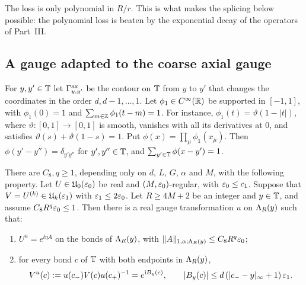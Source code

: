 The loss is only polynomial in $R/r$. This is what makes the splicing below possible: the polynomial loss is beaten by the exponential decay of the operators of Part~III.

\subsection{A gauge adapted to the coarse axial gauge}

For $y,y'\in\mathbb T$ let $\Gamma^{\rm ax}_{y,y'}$ be the contour on $\mathbb T$ from $y$ to $y'$ that changes the coordinates in the order $d,d-1,\dots,1$. Let $\phi_1\in C^\infty(\mathbb R)$ be supported in $[-1,1]$, with $\phi_1(0)=1$ and $\sum_{m\in\mathbb Z}\phi_1(t-m)=1$. For instance, $\phi_1(t)=\vartheta(1-|t|)$, where $\vartheta:[0,1]\to[0,1]$ is smooth, vanishes with all its derivatives at $0$, and satisfies $\vartheta(s)+\vartheta(1-s)=1$. Put $\phi(x)=\prod_\mu\phi_1(x_\mu)$. Then $\phi(y'-y'')=\delta_{y'y''}$ for $y',y''\in\mathbb T$, and $\sum_{y'\in\mathbb T}\phi(x-y')=1$.

\begin{lemma}\label{lem:adapted-gauge}
There are $C_8,q\ge1$, depending only on $d$, $L$, $G$, $\alpha$ and $M$, with the following property. Let $U\in\mathfrak U_0(\varepsilon_0)$ be real and $(M,\varepsilon_0)$-regular, with $\varepsilon_0\le c_1$. Suppose that $V=U^{(k)}\in\mathfrak U_k(\varepsilon_1)$ with $\varepsilon_1\le2\varepsilon_0$. Let $R\ge4M+2$ be an integer and $y\in\mathbb T$, and assume $C_8R^q\varepsilon_0\le1$. Then there is a real gauge transformation $u$ on $\Lambda_R(y)$ such that:
\begin{enumerate}[label=(\roman*)]
\item $U^u=e^{\ii\eta A}$ on the bonds of $\Lambda_R(y)$, with $\|A\|_{1,\alpha;\Lambda_R(y)}\le C_8R^q\varepsilon_0$;
\item for every bond $c$ of $\mathbb T$ with both endpoints in $\Lambda_R(y)$,
\[
V^u(c):=u(c_-)V(c)u(c_+)^{-1}=e^{\mathrm i B_y(c)},\qquad|B_y(c)|\le d\,(|c_--y|_\infty+1)\,\varepsilon_1 .
\]
\end{enumerate}
\end{lemma}

